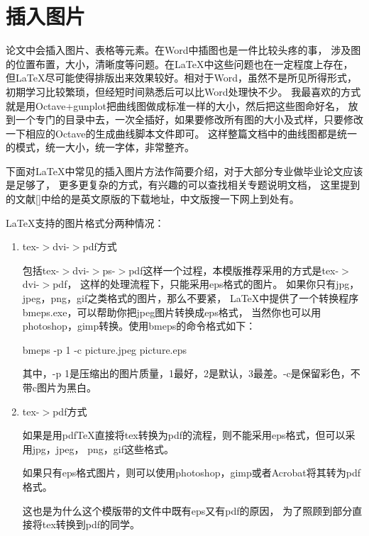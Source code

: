 
\section{插入图片}

论文中会插入图片、表格等元素。在Word中插图也是一件比较头疼的事，
涉及图的位置布置，大小，清晰度等问题。在\LaTeX 中这些问题也在一定程度上存在，
但\LaTeX 尽可能使得排版出来效果较好。相对于Word，虽然不是所见所得形式，
初期学习比较繁琐，但经短时间熟悉后可以比Word处理快不少。
我最喜欢的方式就是用Octave+gunplot把曲线图做成标准一样的大小，然后把这些图命好名，
放到一个专门的目录中去，一次全插好，如果要修改所有图的大小及式样，只要修改一下相应的Octave的生成曲线脚本文件即可。
这样整篇文档中的曲线图都是统一的模式，统一大小，统一字体，非常整齐。

下面对\LaTeX 中常见的插入图片方法作简要介绍，对于大部分专业做毕业论文应该是足够了，
更多更复杂的方式，有兴趣的可以查找相关专题说明文档\cite{epslatex}，
这里提到的文献[]中给的是英文原版的下载地址，中文版搜一下网上到处有。

\LaTeX 支持的图片格式分两种情况：

\begin{enumerate}

\item{tex-$>$dvi-$>$pdf方式}

包括tex-$>$dvi-$>$ps-$>$pdf这样一个过程，本模版推荐采用的方式是tex-$>$dvi-$>$pdf，
这样的处理流程下，只能采用eps格式的图片。
如果你只有jpg，jpeg，png，gif之类格式的图片，那么不要紧，
\LaTeX 中提供了一个转换程序bmeps.exe，可以帮助你把jpeg图片转换成eps格式，
当然你也可以用photoshop，gimp转换。使用bmeps的命令格式如下：

bmeps -p 1 -c picture.jpeg picture.eps

其中，-p 1是压缩出的图片质量，1最好，2是默认，3最差。-c是保留彩色，不带c图片为黑白。

\item{tex-$>$pdf方式}

如果是用pdfTeX直接将tex转换为pdf的流程，则不能采用eps格式，但可以采用jpg，jpeg，
png，gif这些格式。

如果只有eps格式图片，则可以使用photoshop，gimp或者Acrobat将其转为pdf格式。

这也是为什么这个模版带的文件中既有eps又有pdf的原因，
为了照顾到部分直接将tex转换到pdf的同学。

\end{enumerate}

